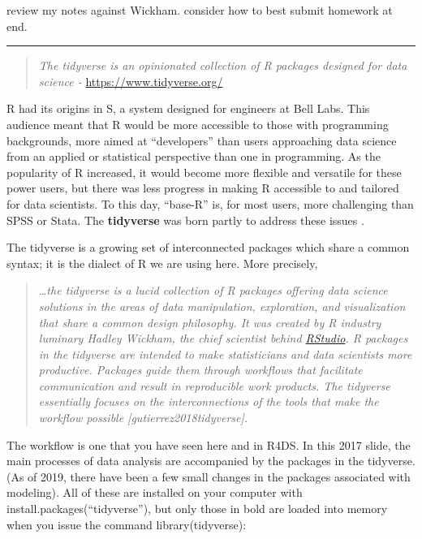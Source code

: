 \documentclass[
  openany]{book}
\begin{document}
review my notes against Wickham. consider how to best submit homework at end.

\begin{center}\rule{0.5\linewidth}{\linethickness}\end{center}

\begin{quote}
\emph{The tidyverse is an opinionated collection of R packages designed for data science -} \url{https://www.tidyverse.org/}
\end{quote}

R had its origins in S, a system designed for engineers at Bell Labs. This audience meant that R would be more accessible to those with programming backgrounds, more aimed at ``developers'' than users approaching data science from an applied or statistical perspective than one in programming. As the popularity of R increased, it would become more flexible and versatile for these power users, but there was less progress in making R accessible to and tailored for data scientists. To this day, ``base-R'' is, for most users, more challenging than SPSS or Stata. The \textbf{tidyverse} was born partly to address these issues \citep{peng2018teaching}.

The tidyverse is a growing set of interconnected packages which share a common syntax; it is the dialect of R we are using here. More precisely,

\begin{quote}
\emph{\ldots the tidyverse is a lucid collection of R packages offering data science solutions in the areas of data manipulation, exploration, and visualization that share a common design philosophy. It was created by R industry luminary Hadley Wickham, the chief scientist behind \href{https://www.rstudio.com/}{RStudio}. R packages in the tidyverse are intended to make statisticians and data scientists more productive. Packages guide them through workflows that facilitate communication and result in reproducible work products. The tidyverse essentially focuses on the interconnections of the tools that make the workflow possible {[}gutierrez2018tidyverse{]}.}
\end{quote}

The workflow is one that you have seen here and in R4DS. In this 2017 slide, the main processes of data analysis are accompanied by the packages in the tidyverse. (As of 2019, there have been a few small changes in the packages associated with modeling). All of these are installed on your computer with install.packages(``tidyverse''), but only those in bold are loaded into memory when you issue the command library(tidyverse):
\end{document}
